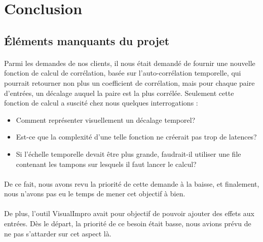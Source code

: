\section{Conclusion}
\subsection{Éléments manquants du projet}
\paragraph{}
Parmi les demandes de nos clients, il nous était demandé de fournir une nouvelle fonction de calcul de corrélation, basée sur l'auto-corrélation temporelle, qui pourrait retourner non plus un coefficient de corrélation, mais pour chaque paire d'entrées, un décalage auquel la paire est la plus corrélée. Seulement cette fonction de calcul a suscité chez nous quelques interrogations :
\begin{itemize}
    \item Comment représenter visuellement un décalage temporel?
    \item Est-ce que la complexité d'une telle fonction ne créerait pas trop de latences?
    \item Si l'échelle temporelle devait être plus grande, faudrait-il utiliser une file contenant les tampons sur lesquels il faut lancer le calcul?
\end{itemize}
\paragraph{}
De ce fait, nous avons revu la priorité de cette demande à la baisse, et finalement, nous n'avons pas eu le temps de mener cet objectif à bien.
\paragraph{}
De plus, l'outil VisualImpro avait pour objectif de pouvoir ajouter des effets aux entrées. Dès le départ, la priorité de ce besoin était basse, nous avions prévu de ne pas s'attarder sur cet aspect là.
\paragraph{}


